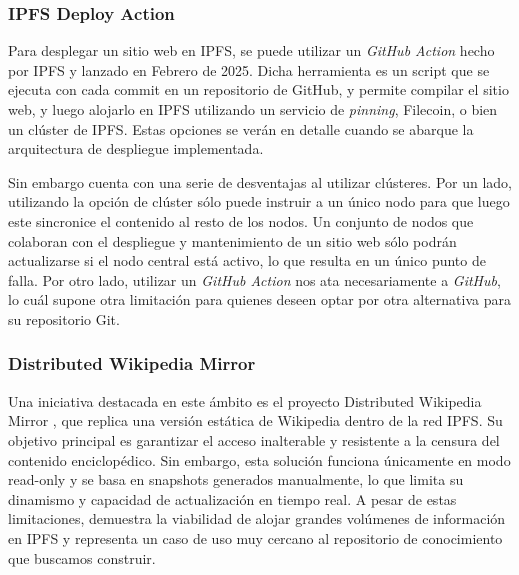 \subsubsection{IPFS Deploy Action}
Para desplegar un sitio web en IPFS, se puede utilizar un \textit{GitHub Action} hecho por IPFS y lanzado en Febrero de 2025. Dicha herramienta es un script que se ejecuta con cada commit en un repositorio de GitHub, y permite compilar el sitio web, y luego alojarlo en IPFS utilizando un servicio de \textit{pinning}, Filecoin, o bien un clúster de IPFS. Estas opciones se verán en detalle cuando se abarque la arquitectura de despliegue implementada.

Sin embargo cuenta con una serie de desventajas al utilizar clústeres. Por un lado, utilizando la opción de clúster sólo puede instruir a un único nodo para que luego este sincronice el contenido al resto de los nodos. Un conjunto de nodos que colaboran con el despliegue y mantenimiento de un sitio web sólo podrán actualizarse si el nodo central está activo, lo que resulta en un único punto de falla. Por otro lado, utilizar un \textit{GitHub Action} nos ata necesariamente a \textit{GitHub}, lo cuál supone otra limitación para quienes deseen optar por otra alternativa para su repositorio Git.

\subsubsection{Distributed Wikipedia Mirror}

Una iniciativa destacada en este ámbito es el proyecto Distributed Wikipedia Mirror \cite{distributed-wikipedia-mirror}, que replica una versión estática de Wikipedia dentro de la red IPFS. Su objetivo principal es garantizar el acceso inalterable y resistente a la censura del contenido enciclopédico. Sin embargo, esta solución funciona únicamente en modo read-only y se basa en snapshots generados manualmente, lo que limita su dinamismo y capacidad de actualización en tiempo real. A pesar de estas limitaciones, demuestra la viabilidad de alojar grandes volúmenes de información en IPFS y representa un caso de uso muy cercano al repositorio de conocimiento que buscamos construir.